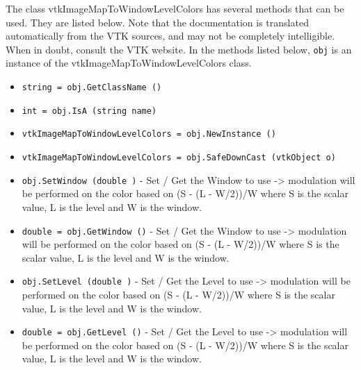 The class vtkImageMapToWindowLevelColors has several methods that can be used.
  They are listed below.
Note that the documentation is translated automatically from the VTK sources,
and may not be completely intelligible.  When in doubt, consult the VTK website.
In the methods listed below, \verb|obj| is an instance of the vtkImageMapToWindowLevelColors class.
\begin{itemize}
\item  \verb|string = obj.GetClassName ()|

\item  \verb|int = obj.IsA (string name)|

\item  \verb|vtkImageMapToWindowLevelColors = obj.NewInstance ()|

\item  \verb|vtkImageMapToWindowLevelColors = obj.SafeDownCast (vtkObject o)|

\item  \verb|obj.SetWindow (double )| -  Set / Get the Window to use -> modulation will be performed on the 
 color based on (S - (L - W/2))/W where S is the scalar value, L is
 the level and W is the window.

\item  \verb|double = obj.GetWindow ()| -  Set / Get the Window to use -> modulation will be performed on the 
 color based on (S - (L - W/2))/W where S is the scalar value, L is
 the level and W is the window.

\item  \verb|obj.SetLevel (double )| -  Set / Get the Level to use -> modulation will be performed on the 
 color based on (S - (L - W/2))/W where S is the scalar value, L is
 the level and W is the window.

\item  \verb|double = obj.GetLevel ()| -  Set / Get the Level to use -> modulation will be performed on the 
 color based on (S - (L - W/2))/W where S is the scalar value, L is
 the level and W is the window.

\end{itemize}
